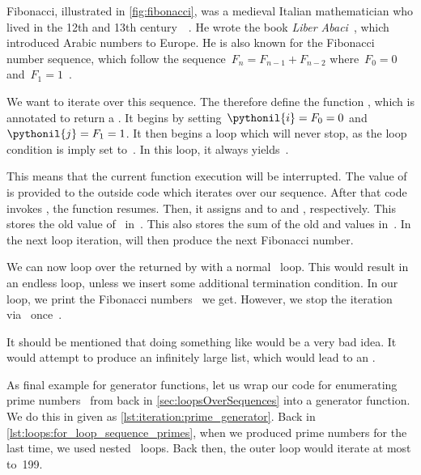 Fibonacci, illustrated in \cref{fig:fibonacci}, was a medieval Italian mathematician who lived in the 12th and 13th century~~\cite{EOEBEB:F}.
He wrote the book \emph{Liber Abaci}~\cite{S2022FLAATIMEOLPBOC}, which introduced Arabic numbers to Europe.
He is also known for the Fibonacci number sequence, which follow the sequence~$F_n=F_{n-1} + F_{n-2}$ where~$F_0=0$ and~$F_1=1$~\cite{W2024MAWWR:FN,S2022FLAATIMEOLPBOC}.

We want to iterate over this sequence.
The therefore define the function , which is annotated to return a .
It begins by setting~$\pythonil{i}=F_0=0$ and~$\pythonil{j}=F_1=1$.
It then begins a  loop which will never stop, as the loop condition is imply set to~.
In this loop, it always yields~.

This means that the current function execution will be interrupted.
The value of  is provided to the outside code which iterates over our sequence.
After that code invokes , the function resumes.
Then, it assigns  and  to  and , respectively.
This stores the old value of~ in~.
This also stores the sum of the old  and  values in~.
In the next loop iteration,  will then produce the next Fibonacci number.

We can now loop over the  returned by  with a normal ~loop.
This would result in an endless loop, unless we insert some additional termination condition.
In our loop, we print the Fibonacci numbers~ we get.
However, we stop the iteration via~ once~.

It should be mentioned that doing something like  would be a very bad idea.
It would attempt to produce an infinitely large list, which would lead to an .

As final example for generator functions, let us wrap our code for enumerating prime numbers~\cite{W2024MAWWR:PN,CP2005PNACP,R1994PNACMFF} from back in \cref{sec:loopsOverSequences} into a generator function.
We do this in  given as \cref{lst:iteration:prime_generator}.
Back in \cref{lst:loops:for_loop_sequence_primes}, when we produced prime numbers for the last time, we used nested ~loops.
Back then, the outer loop would iterate at most to~199.

